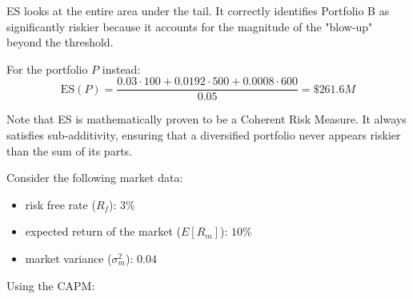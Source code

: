\documentclass[12pt,a4paper]{exam}
\begin{document}
\begin{questions}
\begin{solution}
\begin{parts}
		ES looks at the entire area under the tail. It correctly identifies Portfolio B as significantly riskier because it accounts for the magnitude of the "blow-up" beyond the threshold.
		
		For the portfolio $P$ instead:
		\begin{equation*}
			\text{ES}(P) = \frac{0.03\cdot 100 + 0.0192\cdot 500 + 0.0008\cdot 600}{0.05} = \$261.6 M 
		\end{equation*}
		
		Note that ES is mathematically proven to be a Coherent Risk Measure. It always satisfies sub-additivity, ensuring that a diversified portfolio never appears riskier than the sum of its parts.
	\end{parts}
	
\end{solution}


\question 
Consider the following market data:
\begin{itemize}
	\item risk free rate ($R_f$): $3\%$
	\item expected return of the market ($E[R_m]$): $10\%$
	\item market variance ($\sigma^2_m$): $0.04$
\end{itemize}

Using the CAPM:
\makeemptybox{15cm}


\end{questions}
\end{document}
